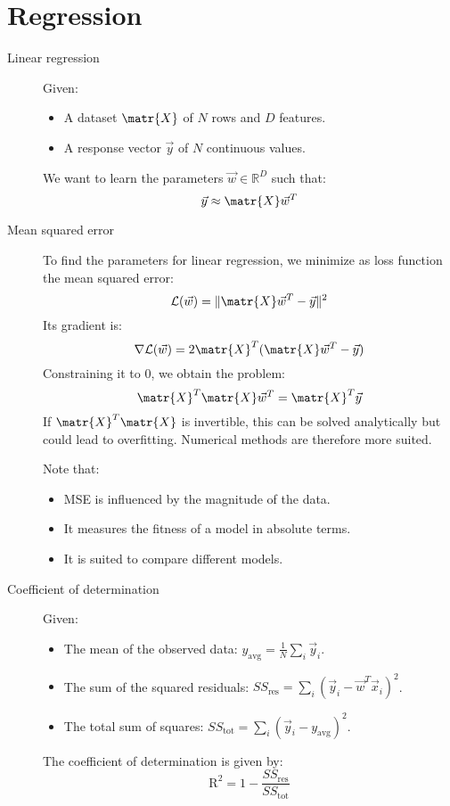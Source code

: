 \chapter{Regression}

\begin{description}
    \item[Linear regression] 
        Given:
        \begin{itemize}
            \item A dataset $\matr{X}$ of $N$ rows and $D$ features.
            \item A response vector $\vec{y}$ of $N$ continuous values.
        \end{itemize}
        We want to learn the parameters $\vec{w} \in \mathbb{R}^D$ such that:
        \[ \vec{y} \approx \matr{X}\vec{w}^T \]

    \item[Mean squared error] 
        To find the parameters for linear regression,
        we minimize as loss function the mean squared error:
        \[  
            \mathcal{L}(\vec{w}) = \Vert \matr{X}\vec{w}^T - \vec{y} \Vert^2    
        \]
        Its gradient is:
        \[ \nabla\mathcal{L}(\vec{w}) = 2\matr{X}^T(\matr{X}\vec{w}^T - \vec{y}) \]
        Constraining it to 0, we obtain the problem:
        \[ \matr{X}^T\matr{X}\vec{w}^T = \matr{X}^T\vec{y} \]
        If $\matr{X}^T\matr{X}$ is invertible, this can be solved analytically but could lead to overfitting.
        Numerical methods are therefore more suited.

        Note that:
        \begin{itemize}
            \item MSE is influenced by the magnitude of the data.
            \item It measures the fitness of a model in absolute terms.
            \item It is suited to compare different models.
        \end{itemize}

    \item[Coefficient of determination] 
        Given:
        \begin{itemize}
            \item The mean of the observed data: $y_\text{avg} = \frac{1}{N} \sum_i \vec{y}_i$.
            \item The sum of the squared residuals: $SS_\text{res} = \sum_i (\vec{y}_i - \vec{w}^T\vec{x}_i)^2$.
            \item The total sum of squares: $SS_\text{tot} = \sum_i (\vec{y}_i - y_\text{avg})^2$.
        \end{itemize}
        The coefficient of determination is given by:
        \[ \text{R}^2 = 1 - \frac{SS_\text{res}}{SS_\text{tot}} \]


\end{description}
